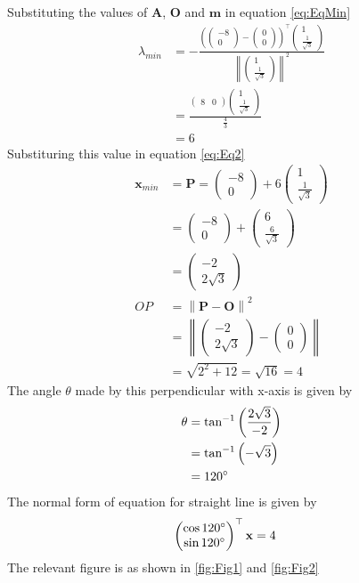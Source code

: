 \documentclass[12pt]{article}
\providecommand{\brak}[1]{\ensuremath{\left(#1\right)}}
\providecommand{\norm}[1]{\left\lVert#1\right\rVert}
\newcommand{\myvec}[1]{\ensuremath{\begin{pmatrix}#1\end{pmatrix}}}
\let\vec\mathbf
\begin{document}
\begin{enumerate}
Substituting the values of $\vec{A}$, $\vec{O}$ and $\vec{m}$ in equation \eqref{eq:EqMin}
\begin{align}
	\lambda_{min} &= -\frac{\brak{\myvec{-8 \\ 0 }-\myvec{0 \\ 0}}^\top\myvec{1 \\ \frac{1}{\sqrt{3}}}}{\norm{\myvec{1 \\ \frac{1}{\sqrt{3}}}}^2}\\ 
	&= \frac{\myvec{8 & 0 }\myvec{1 \\ \frac{1}{\sqrt{3}}}}{\frac{4}{3}}\\ 
	&= 6
\end{align}
Substituring this value in equation \eqref{eq:Eq2}
\begin{align}
	\vec{x}_{min} &= \vec{P} = \myvec{-8 \\ 0}+6\myvec{1 \\ \frac{1}{\sqrt{3}}}  \\
	&= \myvec{-8 \\ 0}+\myvec{6 \\ \frac{6}{\sqrt{3}}} \\
	&= \myvec{-2 \\ 2\sqrt{3}} \\
	OP &= \norm{\vec{P}-\vec{O}}^2 \\ 
	&= \norm{\myvec{-2 \\ 2\sqrt{3}}-\myvec{0 \\ 0}} \\
	&= \sqrt{2^2 + 12} = \sqrt{16} = 4
\end{align}
The angle $\theta$ made by this perpendicular with x-axis is given by
\begin{align}
         \theta &= \tan^{-1}\brak{\frac{2\sqrt{3}}{-2}} \\
	 &= \tan^{-1}\brak{-\sqrt{3}} \\
	 &= 120\degree
\end{align}
The normal form of equation for straight line is given by
\begin{align}
	\myvec{\cos120\degree \\ \sin120\degree}^\top\vec{x} &= 4 
\end{align}
The relevant figure is as shown in \ref{fig:Fig1} and \ref{fig:Fig2}
\begin{figure}[!h]
	\begin{center}

\end{center}
\end{figure}
\end{enumerate}
\end{document}
